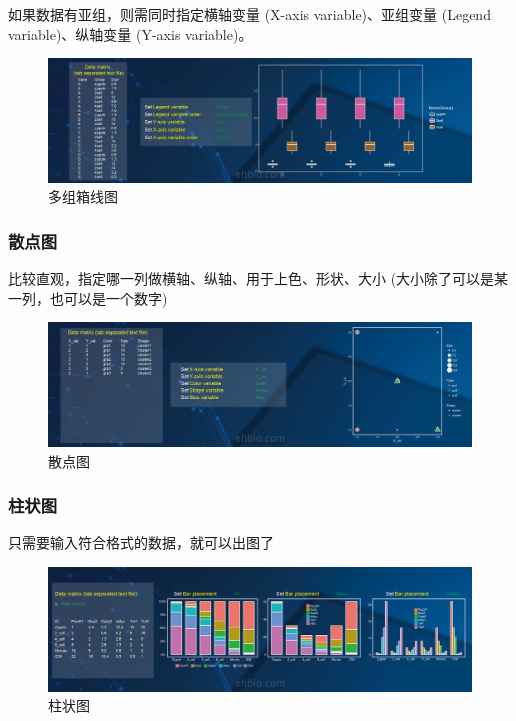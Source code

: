 \documentclass[]{article}
\numberwithin{figure}{section}
\numberwithin{table}{section}
\theoremstyle{definition}
\theoremstyle{definition}
\theoremstyle{definition}
\theoremstyle{remark}
\begin{document}
如果数据有亚组，则需同时指定横轴变量 (X-axis variable)、亚组变量 (Legend
variable)、纵轴变量 (Y-axis variable)。

\begin{figure}[H]

{\centering \includegraphics[width=0.95\linewidth,height=0.7\textheight,keepaspectratio]{images/Boxplot_3} 

}

\caption{多组箱线图}\label{fig:unnamed-chunk-254}
\end{figure}

\subsubsection{散点图}\label{-1}

比较直观，指定哪一列做横轴、纵轴、用于上色、形状、大小
(大小除了可以是某一列，也可以是一个数字)

\begin{figure}[H]

{\centering \includegraphics[width=0.95\linewidth,height=0.7\textheight,keepaspectratio]{images/Scatterplot_1} 

}

\caption{散点图}\label{fig:unnamed-chunk-255}
\end{figure}

\subsubsection{柱状图}

只需要输入符合格式的数据，就可以出图了

\begin{figure}[H]

{\centering \includegraphics[width=0.95\linewidth,height=0.7\textheight,keepaspectratio]{images/Barplot_1} 

}

\caption{柱状图}\label{fig:unnamed-chunk-256}
\end{figure}
\end{document}
